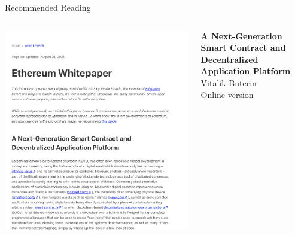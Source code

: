 \documentclass[]{beamer}
\begin{document}
\begin{frame}{Recommended Reading}
\begin{columns}
	\begin{column}{0.3\textwidth}
	\center
	\includegraphics[width=\textwidth , frame]{../assets/images/whitepaper_cover.png}
	\end{column}
	\begin{column}{0.7\textwidth}
	\textbf{A Next-Generation Smart Contract and Decentralized Application Platform} \\
	Vitalik Buterin  \\
	\link \href{https://ethereum.org/en/whitepaper/}{Online version}
	\end{column}
\end{columns}
\end{frame}
\end{document}

